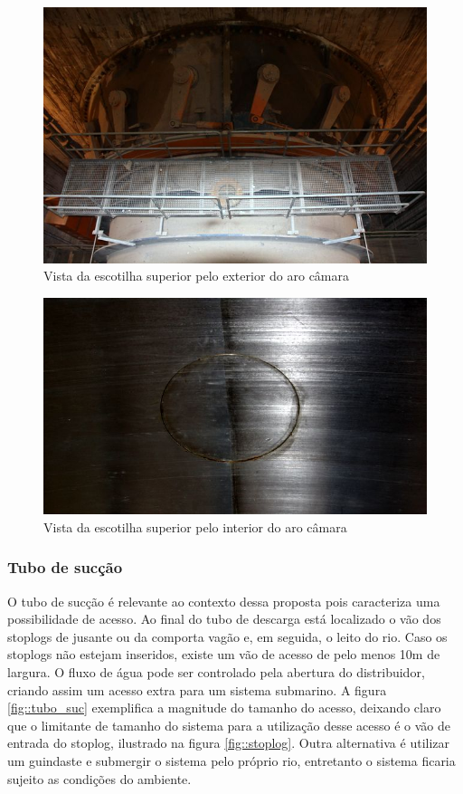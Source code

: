 \begin{figure}[h!]	
	\includegraphics[width=\columnwidth]{figs/viagem/2015_04_28/UG/img_4979}
	\caption{Vista da escotilha superior pelo exterior do aro câmara}
	\label{fig::esc_sup_ext}
\end{figure}

\begin{figure}[h!]	
	\includegraphics[width=\columnwidth]{figs/viagem/2015_04_28/UG/img_4982}
	\caption{Vista da escotilha superior pelo interior do aro câmara}
	\label{fig::esc_sup_int}
\end{figure}

\subsubsection{Tubo de sucção}

O tubo de sucção é relevante ao contexto dessa proposta pois caracteriza uma 
possibilidade de acesso. Ao final do tubo de descarga está localizado o vão dos stoplogs 
de jusante ou da comporta vagão e, em seguida, o leito do rio. Caso os stoplogs 
não estejam inseridos, existe um vão de acesso de pelo menos 10m de largura. O 
fluxo de água pode ser controlado pela abertura do distribuidor, criando assim 
um acesso extra para um sistema submarino. A figura \ref{fig::tubo_suc}
exemplifica a magnitude do tamanho do acesso, deixando claro que o limitante de
tamanho do sistema para a utilização desse acesso é o vão de entrada do stoplog,
ilustrado na figura \ref{fig::stoplog}. Outra alternativa é utilizar um
guindaste e submergir o sistema pelo próprio rio, entretanto o sistema ficaria
sujeito as condições do ambiente.

